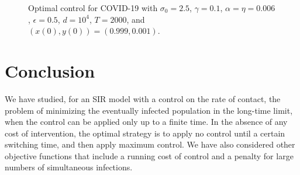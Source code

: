 \documentclass[english,12pt,letter]{article}
\newcommand{\Rnot}{\sigma_0}
\begin{document}
\begin{figure}
    \centering
    \caption{Optimal control for COVID-19 with $\Rnot=2.5$, $\gamma=0.1$,
                $\alpha=\eta=0.006$, $\epsilon=0.5$, $d=10^4$, $T=2000$, and $(x(0),y(0)) =
                (0.999,0.001)$.\label{fig:real-world-3}}
\end{figure}


\section{Conclusion\label{sec:conclusion}}
We have studied, for an SIR model with a control on the rate of contact, the
problem of minimizing the eventually infected population in the long-time limit,
when the control can be applied only up to a finite time.  In the absence of any
cost of intervention, the optimal strategy is to apply no control until a
certain switching time, and then apply maximum control.  We have also considered
other objective functions that include a running cost of control and a penalty for
large numbers of simultaneous infections.
\end{document}

